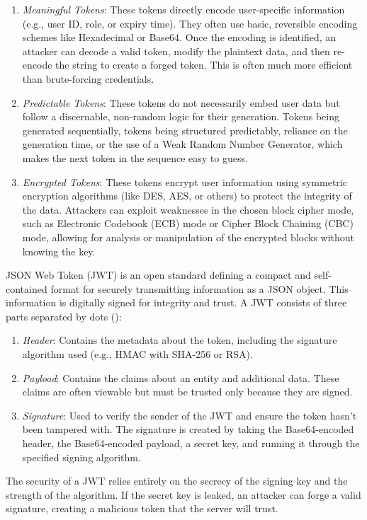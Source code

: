 \begin{enumerate}
    \item \textit{Meaningful Tokens}: These tokens directly encode user-specific information (e.g., user ID, role, or expiry time). They often use basic, reversible encoding schemes like Hexadecimal or Base64. Once the encoding is identified, an attacker can decode a valid token, modify the plaintext data, and then re-encode the string to create a forged token. This is often much more efficient than brute-forcing credentials.
    \item \textit{Predictable Tokens}: These tokens do not necessarily embed user data but follow a discernable, non-random logic for their generation. Tokens being generated sequentially, tokens being structured predictably, reliance on the generation time, or the use of a Weak Random Number Generator, which makes the next token in the sequence easy to guess.
    \item \textit{Encrypted Tokens}: These tokens encrypt user information using symmetric encryption algorithms (like DES, AES, or others) to protect the integrity of the data. Attackers can exploit weaknesses in the chosen block cipher mode, such as Electronic Codebook (ECB) mode or Cipher Block Chaining (CBC) mode, allowing for analysis or manipulation of the encrypted blocks without knowing the key.
\end{enumerate}

JSON Web Token (JWT) is an open standard defining a compact and self-contained format for securely transmitting information as a JSON object. This information is digitally signed for integrity and trust. A JWT consists of three parts separated by dots ():

\begin{enumerate}
    \item \textit{Header}: Contains the metadata about the token, including the signature algorithm used (e.g., HMAC with SHA-256 or RSA).
    \item \textit{Payload}: Contains the claims about an entity and additional data. These claims are often viewable but must be trusted only because they are signed.
    \item \textit{Signature}: Used to verify the sender of the JWT and ensure the token hasn't been tampered with. The signature is created by taking the Base64-encoded header, the Base64-encoded payload, a secret key, and running it through the specified signing algorithm.
\end{enumerate}

The security of a JWT relies entirely on the secrecy of the signing key and the strength of the algorithm. If the secret key is leaked, an attacker can forge a valid signature, creating a malicious token that the server will trust.